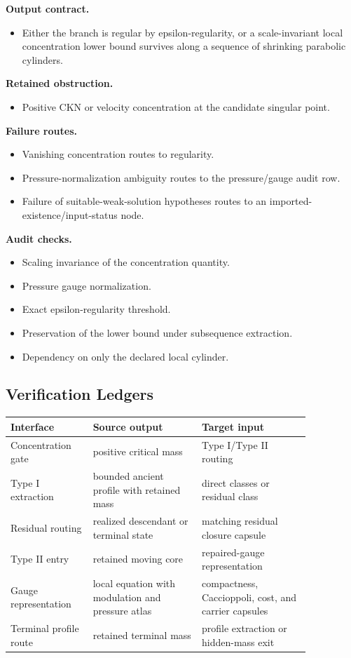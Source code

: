 \documentclass[11pt]{amsart}
\newcommand{\capsulefield}[1]{\par\smallskip\noindent\textbf{#1.}\ }
\begin{document}
\capsulefield{Output contract}
\begin{itemize}
  \item Either the branch is regular by epsilon-regularity, or a scale-invariant local concentration lower bound survives along a sequence of shrinking parabolic cylinders.
\end{itemize}

\capsulefield{Retained obstruction}
\begin{itemize}
  \item Positive CKN or velocity concentration at the candidate singular point.
\end{itemize}

\capsulefield{Failure routes}
\begin{itemize}
  \item Vanishing concentration routes to regularity.
  \item Pressure-normalization ambiguity routes to the pressure/gauge audit row.
  \item Failure of suitable-weak-solution hypotheses routes to an imported-existence/input-status node.
\end{itemize}

\capsulefield{Audit checks}
\begin{itemize}
  \item Scaling invariance of the concentration quantity.
  \item Pressure gauge normalization.
  \item Exact epsilon-regularity threshold.
  \item Preservation of the lower bound under subsequence extraction.
  \item Dependency on only the declared local cylinder.
\end{itemize}

\subsection{Verification Ledgers}

\begin{center}
\begin{tabular}{p{0.23\linewidth}p{0.31\linewidth}p{0.31\linewidth}}
\toprule
Interface & Source output & Target input \\
\midrule
Concentration gate & positive critical mass & Type I/Type II routing \\
Type I extraction & bounded ancient profile with retained mass & direct classes or residual class \\
Residual routing & realized descendant or terminal state & matching residual closure capsule \\
Type II entry & retained moving core & repaired-gauge representation \\
Gauge representation & local equation with modulation and pressure atlas & compactness, Caccioppoli, cost, and carrier capsules \\
Terminal profile route & retained terminal mass & profile extraction or hidden-mass exit \\
\bottomrule
\end{tabular}
\end{center}
\end{document}
